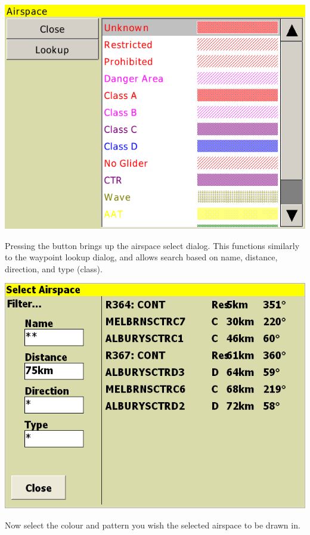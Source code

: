 \documentclass[a4paper,12pt]{refrep}
\begin{document}
\begin{center}
\includegraphics[angle=0,width=\linewidth,keepaspectratio='true']{figures/config-airspacecolors.png}
\end{center}

Pressing the  button brings up the airspace select dialog.
This functions similarly to the waypoint lookup dialog, and allows
search based on name, distance, direction, and type (class).  

\begin{center}
\includegraphics[angle=0,width=\linewidth,keepaspectratio='true']{figures/airspacelookup.png}
\end{center}

Now select the colour and pattern you wish the selected airspace to be drawn in.
\end{document}
